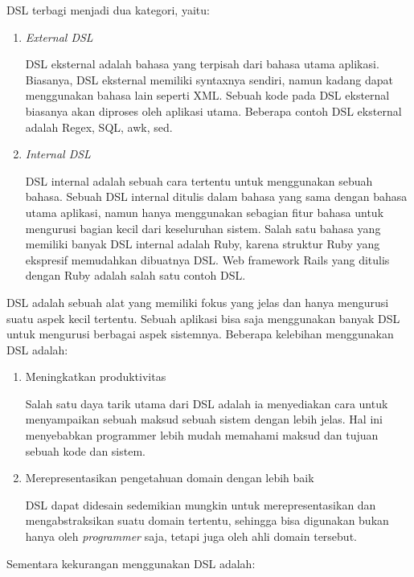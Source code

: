 DSL terbagi menjadi dua kategori, yaitu:

\begin{enumerate}
    \item \textit{External DSL}

    DSL eksternal adalah bahasa yang terpisah dari bahasa utama aplikasi.
    Biasanya, DSL eksternal memiliki syntaxnya sendiri, namun kadang dapat menggunakan
    bahasa lain seperti XML. Sebuah kode pada DSL eksternal biasanya akan diproses oleh
    aplikasi utama. Beberapa contoh DSL eksternal adalah Regex, SQL, awk, sed.

    \item \textit{Internal DSL}
    
    DSL internal adalah sebuah cara tertentu untuk menggunakan sebuah bahasa.
    Sebuah DSL internal ditulis dalam bahasa yang sama dengan bahasa utama aplikasi,
    namun hanya menggunakan sebagian fitur bahasa untuk mengurusi bagian kecil 
    dari keseluruhan sistem. Salah satu bahasa yang memiliki banyak DSL internal adalah Ruby,
    karena struktur Ruby yang ekspresif memudahkan dibuatnya DSL.
    Web framework Rails yang ditulis dengan Ruby adalah salah satu contoh DSL.
\end{enumerate}

DSL adalah sebuah alat yang memiliki fokus yang jelas dan hanya mengurusi suatu
aspek kecil tertentu. Sebuah aplikasi bisa saja menggunakan banyak DSL untuk mengurusi
berbagai aspek sistemnya. Beberapa kelebihan menggunakan DSL adalah:

\begin{enumerate}
    \item Meningkatkan produktivitas

    Salah satu daya tarik utama dari DSL adalah ia menyediakan cara untuk menyampaikan
    sebuah maksud sebuah sistem dengan lebih jelas.
    Hal ini menyebabkan programmer lebih mudah memahami maksud dan
    tujuan sebuah kode dan sistem.

    \item Merepresentasikan pengetahuan domain dengan lebih baik

    DSL dapat didesain sedemikian mungkin untuk merepresentasikan dan mengabstraksikan
    suatu domain tertentu, sehingga
    bisa digunakan bukan hanya oleh \textit{programmer} saja, tetapi juga oleh ahli domain tersebut.
\end{enumerate}

Sementara kekurangan menggunakan DSL adalah:

